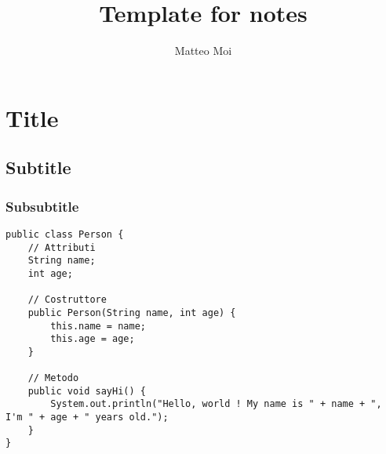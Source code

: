 \documentclass[a4paper, 12pt]{article}
\begin{document}
    \title{Template for notes}
    \author{Matteo Moi}
    \date{}
    \maketitle

    \tableofcontents
    \newpage



    \section{Title}

    \subsection{Subtitle}

    \subsubsection{Subsubtitle}

    \begin{lstlisting}
public class Person {
    // Attributi
    String name;
    int age;

    // Costruttore
    public Person(String name, int age) {
        this.name = name;
        this.age = age;
    }

    // Metodo
    public void sayHi() {
        System.out.println("Hello, world ! My name is " + name + ", I'm " + age + " years old.");
    }
}
    \end{lstlisting}
\end{document}
